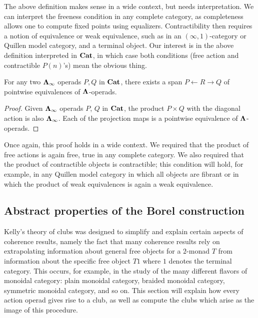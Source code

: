\begin{rem}
The above definition makes sense in a wide context, but needs interpretation. We can interpret the freeness condition in any complete category, as completeness allows one to compute fixed points using equalizers. Contractibility then requires a notion of equivalence or weak equivalence, such as in an $(\infty, 1)$-category or Quillen model category, and a terminal object. Our interest is in the above definition interpreted in $\mathbf{Cat}$, in which case both conditions (free action and contractible $P(n)$'s) mean the obvious thing.
\end{rem}

\begin{prop}
For any two $\mathbf{\Lambda}_{\infty}$ operads $P,Q$ in $\mathbf{Cat}$, there exists a span $P \leftarrow R \rightarrow Q$ of pointwise equivalences of $\mathbf{\Lambda}$-operads.
\end{prop}
\begin{proof}
Given $\mathbf{\Lambda}_{\infty}$ operads $P$, $Q$ in $\mathbf{Cat}$, the product $P \times Q$ with the diagonal action is also $\mathbf{\Lambda}_{\infty}$. Each of the projection maps is a pointwise equivalence of $\mathbf{\Lambda}$-operads.
\end{proof}
\begin{rem}
Once again, this proof holds in a wide context. We required that the product of free actions is again free, true in any complete category. We also required that the product of contractible objects is contractible; this condition will hold, for example, in any Quillen model category in which all objects are fibrant or in which the product of weak equivalences is again a weak equivalence.
\end{rem}


\subsection{Abstract properties of the Borel construction}

Kelly's theory of clubs \cite{kelly_club1, kelly_club0, kelly_club2} was designed to simplify and explain certain aspects of coherence results, namely the fact that many coherence results rely on extrapolating information about general free objects for a $2$-monad $T$ from information about the specific free object $T1$ where $1$ denotes the terminal category. This occurs, for example, in the study of the many different flavors of monoidal category:  plain monoidal category, braided monoidal category, symmetric monoidal category, and so on. This section will explain how every action operad gives rise to a club, as well as compute the clubs which arise as the image of this procedure.

